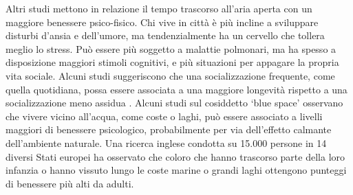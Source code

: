 \documentclass[12pt]{book} %
\begin{document}
\begin{mdframed}[linewidth=1pt]
Altri studi mettono in relazione il tempo trascorso all'aria aperta con un maggiore benessere psico-fisico. Chi vive in città è più incline a sviluppare disturbi d'ansia e dell'umore, ma tendenzialmente ha un cervello che tollera meglio lo stress. Può
essere più soggetto a malattie polmonari, ma ha spesso a disposizione maggiori stimoli cognitivi, e più situazioni per appagare la propria vita sociale. Alcuni studi suggeriscono che una socializzazione frequente, come quella quotidiana, possa essere associata a una maggiore longevità rispetto a una socializzazione meno assidua .
Alcuni studi sul cosiddetto ‘blue space’ osservano che vivere vicino all’acqua, come coste o laghi, può essere associato a livelli maggiori di benessere psicologico, probabilmente per via dell’effetto calmante dell’ambiente naturale. Una ricerca inglese condotta su 15.000 persone in 14 diversi Stati europei ha osservato che coloro che hanno trascorso parte della loro infanzia o hanno vissuto lungo le coste marine o grandi laghi ottengono punteggi di benessere più alti da adulti.


\end{mdframed}
\end{document}
